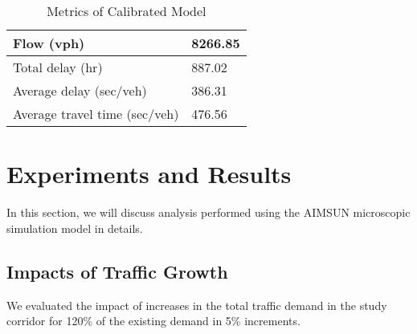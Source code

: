 \documentclass{article}
\begin{document}
\begin{table}[]
\centering
\caption{Metrics of Calibrated Model}
\begin{tabular}{|l|l|}
\hline
Flow (vph)                    & 8266.85 \\ \hline
Total delay (hr)              & 887.02  \\ \hline
Average delay (sec/veh)       & 386.31  \\ \hline
Average travel time (sec/veh) & 476.56  \\ \hline
\end{tabular}
\label{basic}
\end{table}

\section{Experiments and Results}
In this section, we will discuss analysis performed using the AIMSUN microscopic simulation model in details.

\subsection{Impacts of Traffic Growth}
We evaluated the impact of increases in the total traffic demand in the study corridor for 120\% of the existing demand in 5\% increments.

\end{document}
